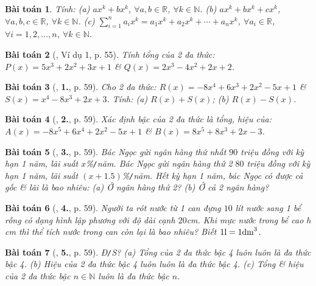 \documentclass{article}
\numberwithin{equation}{section}
\newtheorem{baitoan}{Bài toán}
\begin{document}
\begin{baitoan}
	Tính: (a) $ax^k + bx^k$, $\forall a,b\in\mathbb{R}$, $\forall k\in\mathbb{N}$. (b) $ax^k + bx^k + cx^k$, $\forall a,b,c\in\mathbb{R}$, $\forall k\in\mathbb{N}$. (c) $\sum_{i=1}^n a_ix^k = a_1x^k + a_2x^k + \cdots + a_nx^k$, $\forall a_i\in\mathbb{R}$, $\forall i = 1,2,\ldots,n$, $\forall k\in\mathbb{N}$.
\end{baitoan}

\begin{baitoan}[\cite{SGK_Toan_7_Canh_Dieu_tap_2}, Ví dụ 1, p. 55]
	Tính tổng của 2 đa thức: $P(x) = 5x^3 + 2x^2 + 3x + 1$ \& $Q(x) = 2x^3 - 4x^2 + 2x + 2$.
\end{baitoan}

\begin{baitoan}[\cite{SGK_Toan_7_Canh_Dieu_tap_2}, \textbf{1.}, p. 59]
	Cho 2 đa thức: $R(x) = -8x^4 + 6x^3 + 2x^2 - 5x + 1$ \& $S(x) = x^4 - 8x^3 + 2x + 3$. Tính: (a) $R(x) + S(x)$; (b) $R(x) - S(x)$.
\end{baitoan}

\begin{baitoan}[\cite{SGK_Toan_7_Canh_Dieu_tap_2}, \textbf{2.}, p. 59]
	Xác định bậc của 2 đa thức là tổng, hiệu của: $A(x) = -8x^5 + 6x^4 + 2x^2 - 5x + 1$ \& $B(x) = 8x^5 + 8x^3 + 2x - 3$.
\end{baitoan}

\begin{baitoan}[\cite{SGK_Toan_7_Canh_Dieu_tap_2}, \textbf{3.}, p. 59]
	Bác Ngọc gửi ngân hàng thứ nhất $90$ triệu đồng với kỳ hạn 1 năm, lãi suất $x$\%\emph{\texttt{/}}năm. Bác Ngọc gửi ngân hàng thứ 2 $80$ triệu đồng với kỳ hạn 1 năm, lãi suất $(x + 1.5)$\%\emph{\texttt{/}}năm. Hết kỳ hạn 1 năm, bác Ngọc có được cả gốc \& lãi là bao nhiêu: (a) Ở ngân hàng thứ 2? (b) Ở cả 2 ngân hàng?
\end{baitoan}

\begin{baitoan}[\cite{SGK_Toan_7_Canh_Dieu_tap_2}, \textbf{4.}, p. 59]
	Người ta rót nước từ 1 can đựng $10$ lít nước sang 1 bể rỗng có dạng hình lập phương với độ dài cạnh $20$\emph{cm}. Khi mực nước trong bể cao $h$ \emph{cm} thì thể tích nước trong can còn lại là bao nhiêu? Biết $1{\rm l} = 1{\rm dm}^3$.
\end{baitoan}

\begin{baitoan}[\cite{SGK_Toan_7_Canh_Dieu_tap_2}, \textbf{5.}, p. 59]
	\emph{Đ\texttt{/}S?} (a) Tổng của 2 đa thức bậc 4 luôn luôn là đa thức bậc 4. (b) Hiệu của 2 đa thức bậc 4 luôn luôn là đa thức bậc 4. (c) Tổng \& hiệu của 2 đa thức bậc $n\in\mathbb{N}$ luôn là đa thức bậc $n$.
\end{baitoan}
\end{document}
